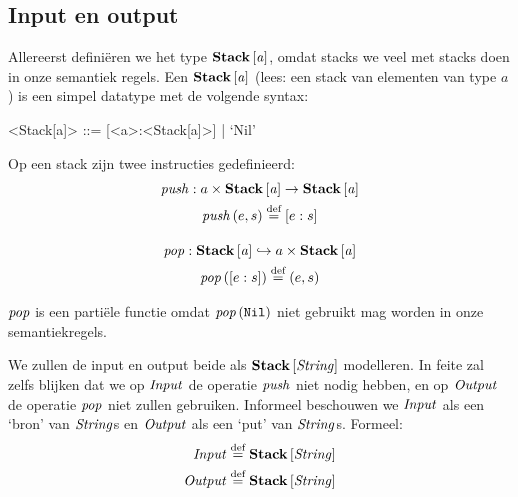 \subsection{Input en output}
\label{sec:def:io}

Allereerst definiëren we het type $\mathbf{Stack}\left[\mathit{a}\right]$, omdat stacks we veel met stacks doen in onze semantiek regels. Een $\mathbf{Stack}\left[\mathit{a}\right]$ (lees: een stack van elementen van type $a$) is een
simpel datatype met de volgende syntax:

\begin{grammar}
	<Stack[a]> ::= [<a>:<Stack[a]>] | `Nil'
\end{grammar}

Op een stack zijn twee instructies gedefinieerd:
\begin{gather*}
	\mathit{push} : a \times \mathbf{Stack}\left[\mathit{a}\right] \to \mathbf{Stack}\left[\mathit{a}\right] \\
	\mathit{push}\left(e, s\right) \stackrel{\text{def}}{=} [e:s] \\[1em]
	\mathit{pop} : \mathbf{Stack}\left[\mathit{a}\right] \hookrightarrow a \times \mathbf{Stack}\left[\mathit{a}\right] \\
	\mathit{pop}\left([e:s]\right) \stackrel{\text{def}}{=} (e,s) \\
\end{gather*}

$\mathit{pop}$ is een partiële functie omdat $\mathit{pop}\left(\texttt{Nil}\right)$ niet gebruikt mag worden in onze semantiekregels.

\medskip
We zullen de input en output beide als $\mathbf{Stack}\left[\mathit{\mathit{String}}\right]$ modelleren. In feite
zal zelfs blijken dat we op $\mathit{Input}$ de operatie $\mathit{push}$ niet nodig hebben,
en op $\mathit{Output}$ de operatie $\mathit{pop}$ niet zullen gebruiken. Informeel
beschouwen we $\mathit{Input}$ als een `bron' van $\mathit{String}$s en $\mathit{Output}$ als een `put'
van $\mathit{String}$s. Formeel:
\begin{align*}
	\mathit{Input} &\stackrel{\text{def}}{=} \mathbf{Stack}\left[\mathit{\mathit{String}}\right] \\ \mathit{Output} &\stackrel{\text{def}}{=} \mathbf{Stack}\left[\mathit{\mathit{String}}\right]
\end{align*}

